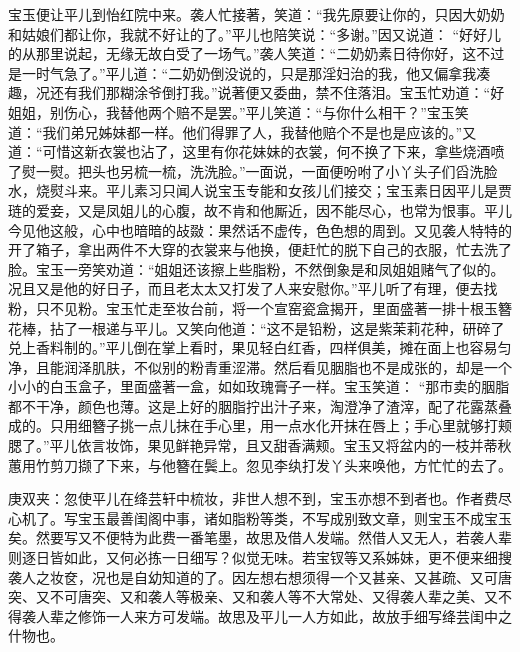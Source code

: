 \begin{parag}
    宝玉便让平儿到怡红院中来。袭人忙接著，笑道：“我先原要让你的，只因大奶奶和姑娘们都让你，我就不好让的了。”平儿也陪笑说：“多谢。”因又说道： “好好儿的从那里说起，无缘无故白受了一场气。”袭人笑道：“二奶奶素日待你好，这不过是一时气急了。”平儿道：“二奶奶倒没说的，只是那淫妇治的我，他又偏拿我凑趣，况还有我们那糊涂爷倒打我。”说著便又委曲，禁不住落泪。宝玉忙劝道：“好姐姐，别伤心，我替他两个赔不是罢。”平儿笑道：“与你什么相干？”宝玉笑道：“我们弟兄姊妹都一样。他们得罪了人，我替他赔个不是也是应该的。”又道：“可惜这新衣裳也沾了，这里有你花妹妹的衣裳，何不换了下来，拿些烧酒喷了熨一熨。把头也另梳一梳，洗洗脸。”一面说，一面便吩咐了小丫头子们舀洗脸水，烧熨斗来。平儿素习只闻人说宝玉专能和女孩儿们接交；宝玉素日因平儿是贾琏的爱妾，又是凤姐儿的心腹，故不肯和他厮近，因不能尽心，也常为恨事。平儿今见他这般，心中也暗暗的敁敠：果然话不虚传，色色想的周到。又见袭人特特的开了箱子，拿出两件不大穿的衣裳来与他换，便赶忙的脱下自己的衣服，忙去洗了脸。宝玉一旁笑劝道：“姐姐还该擦上些脂粉，不然倒象是和凤姐姐赌气了似的。况且又是他的好日子，而且老太太又打发了人来安慰你。”平儿听了有理，便去找粉，只不见粉。宝玉忙走至妆台前，将一个宣窑瓷盒揭开，里面盛著一排十根玉簪花棒，拈了一根递与平儿。又笑向他道：“这不是铅粉，这是紫茉莉花种，研碎了兑上香料制的。”平儿倒在掌上看时，果见轻白红香，四样俱美，摊在面上也容易匀净，且能润泽肌肤，不似别的粉青重涩滞。然后看见胭脂也不是成张的，却是一个小小的白玉盒子，里面盛著一盒，如如玫瑰膏子一样。宝玉笑道： “那市卖的胭脂都不干净，颜色也薄。这是上好的胭脂拧出汁子来，淘澄净了渣滓，配了花露蒸叠成的。只用细簪子挑一点儿抹在手心里，用一点水化开抹在唇上；手心里就够打颊腮了。”平儿依言妆饰，果见鲜艳异常，且又甜香满颊。宝玉又将盆内的一枝并蒂秋蕙用竹剪刀撷了下来，与他簪在鬓上。忽见李纨打发丫头来唤他，方忙忙的去了。\begin{note}庚双夹：忽使平儿在绛芸轩中梳妆，非世人想不到，宝玉亦想不到者也。作者费尽心机了。写宝玉最善闺阁中事，诸如脂粉等类，不写成别致文章，则宝玉不成宝玉矣。然要写又不便特为此费一番笔墨，故思及借人发端。然借人又无人，若袭人辈则逐日皆如此，又何必拣一日细写？似觉无味。若宝钗等又系姊妹，更不便来细搜袭人之妆奁，况也是自幼知道的了。因左想右想须得一个又甚亲、又甚疏、又可唐突、又不可唐突、又和袭人等极亲、又和袭人等不大常处、又得袭人辈之美、又不得袭人辈之修饰一人来方可发端。故思及平儿一人方如此，故放手细写绛芸闺中之什物也。\end{note}
\end{parag}


